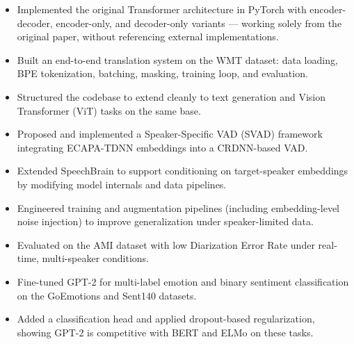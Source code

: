 \documentclass[11pt,letterpaper]{article}
\begin{document}
\begin{itemize}
  \item Implemented the original Transformer architecture in PyTorch with encoder-decoder, encoder-only, and decoder-only variants --- working solely from the original paper, without referencing external implementations.
  \item Built an end-to-end translation system on the WMT dataset: data loading, BPE tokenization, batching, masking, training loop, and evaluation.
  \item Structured the codebase to extend cleanly to text generation and Vision Transformer (ViT) tasks on the same base.
\end{itemize}

\begin{itemize}
  \item Proposed and implemented a Speaker-Specific VAD (SVAD) framework integrating ECAPA-TDNN embeddings into a CRDNN-based VAD.
  \item Extended SpeechBrain to support conditioning on target-speaker embeddings by modifying model internals and data pipelines.
  \item Engineered training and augmentation pipelines (including embedding-level noise injection) to improve generalization under speaker-limited data.
  \item Evaluated on the AMI dataset with low Diarization Error Rate under real-time, multi-speaker conditions.
\end{itemize}

\begin{itemize}
  \item Fine-tuned GPT-2 for multi-label emotion and binary sentiment classification on the GoEmotions and Sent140 datasets.
  \item Added a classification head and applied dropout-based regularization, showing GPT-2 is competitive with BERT and ELMo on these tasks.
\end{itemize}
\end{document}
